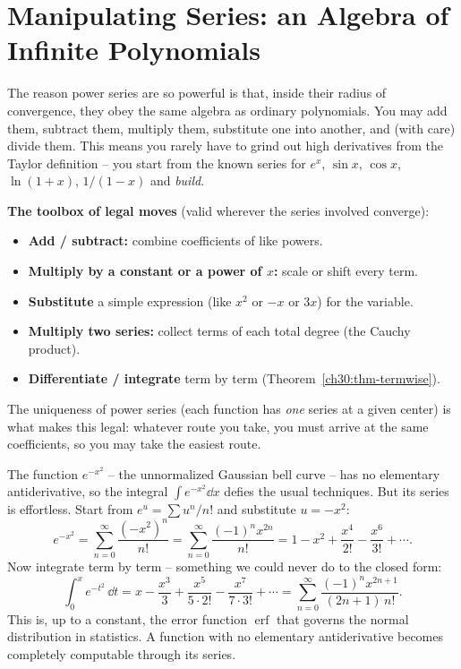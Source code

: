 \section{Manipulating Series: an Algebra of Infinite Polynomials}
\label{ch30:sec-manipulating}

The reason power series are so powerful is that, inside their radius of convergence, they obey the same algebra as ordinary polynomials. You may add them, subtract them, multiply them, substitute one into another, and (with care) divide them. This means you rarely have to grind out high derivatives from the Taylor definition -- you start from the known series for $e^x$, $\sin x$, $\cos x$, $\ln(1+x)$, $1/(1-x)$ and \emph{build}.

\begin{focusbox}
\textbf{The toolbox of legal moves} (valid wherever the series involved converge):
\begin{itemize}
  \item \textbf{Add / subtract:} combine coefficients of like powers.
  \item \textbf{Multiply by a constant or a power of $x$:} scale or shift every term.
  \item \textbf{Substitute} a simple expression (like $x^2$ or $-x$ or $3x$) for the variable.
  \item \textbf{Multiply two series:} collect terms of each total degree (the Cauchy product).
  \item \textbf{Differentiate / integrate} term by term (Theorem~\ref{ch30:thm-termwise}).
\end{itemize}
The uniqueness of power series (each function has \emph{one} series at a given center) is what makes this legal: whatever route you take, you must arrive at the same coefficients, so you may take the easiest route.
\end{focusbox}

\begin{example}
\label{ch30:ex-sub}
The function $e^{-x^2}$ -- the unnormalized Gaussian bell curve -- has no elementary antiderivative, so the integral $\int e^{-x^2}\dd x$ defies the usual techniques. But its series is effortless. Start from $e^u = \sum u^n/n!$ and substitute $u = -x^2$:
\[
  e^{-x^2} = \sum_{n=0}^{\infty}\frac{(-x^2)^n}{n!}
  = \sum_{n=0}^{\infty}\frac{(-1)^n x^{2n}}{n!}
  = 1 - x^2 + \frac{x^4}{2!} - \frac{x^6}{3!} + \cdots.
\]
Now integrate term by term -- something we could never do to the closed form:
\[
  \int_0^x e^{-t^2}\,\dd t
  = x - \frac{x^3}{3} + \frac{x^5}{5\cdot 2!} - \frac{x^7}{7\cdot 3!} + \cdots
  = \sum_{n=0}^{\infty}\frac{(-1)^n x^{2n+1}}{(2n+1)\,n!}.
\]
This is, up to a constant, the error function $\operatorname{erf}$ that governs the normal distribution in statistics. A function with no elementary antiderivative becomes completely computable through its series.
\end{example}

